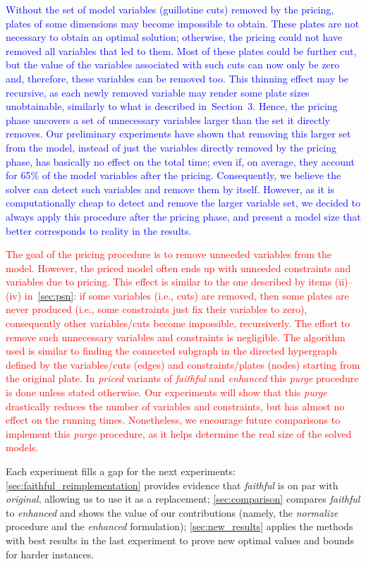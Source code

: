 \documentclass[smallextended]{svjour3}       %
\newif\iffinalversion
\newcommand{\newtext}[1]{\iffinalversion%
#1%
\else%
\textcolor{blue}{#1}%
\fi%
}
\newcommand{\oldtext}[1]{\iffinalversion%
\else%
\textcolor{red}{#1}%
\fi%
}
\begin{document}
\newtext{Without the set of model variables (guillotine cuts) removed by the pricing, plates of some dimensions may become impossible to obtain. These plates are not necessary to obtain an optimal solution; otherwise, the pricing could not have removed all variables that led to them. Most of these plates could be further cut, but the value of the variables associated with such cuts can now only be zero and, therefore, these variables can be removed too. This thinning effect may be recursive, as each newly removed variable may render some plate sizes unobtainable, similarly to what is described in~Section~3. Hence, the pricing phase uncovers a set of unnecessary variables larger than the set it directly removes. Our preliminary experiments have shown that removing this larger set from the model, instead of just the variables directly removed by the pricing phase, has basically no effect on the total time; even if, on average, they account for 65\% of the model variables after the pricing. Consequently, we believe the solver can detect such variables and remove them by itself. However, as it is computationally cheap to detect and remove the larger variable set, we decided to always apply this procedure after the pricing phase, and present a model size that better corresponds to reality in the results.}
\oldtext{The goal of the pricing procedure is to remove unneeded variables from the model. However, the priced model often ends up with unneeded constraints and variables due to pricing. This effect is similar to the one described by items (ii)--(iv) in~\autoref{sec:psn}: if some variables (i.e., cuts) are removed, then some plates are never produced (i.e., some constraints just fix their variables to zero), consequently other variables/cuts become impossible, recursiverly. The effort to remove such unnecessary variables and constraints is negligible. The algorithm used is similar to finding the connected subgraph in the directed hypergraph defined by the variables/cuts (edges) and constraints/plates (nodes) starting from the original plate. In \emph{priced} variants of \emph{faithful} and \emph{enhanced} this \emph{purge} procedure is done unless stated otherwise. Our experiments will show that this \emph{purge} drastically reduces the number of variables and constraints, but has almost no effect on the running times. Nonetheless, we encourage future comparisons to implement this \emph{purge} procedure, as it helps determine the real size of the solved models.}

Each experiment fills a gap for the next experiments:%
\autoref{sec:faithful_reimplementation} provides evidence that \emph{faithful} is on par with \emph{original}, allowing us to use it as a replacement;
\autoref{sec:comparison} compares \emph{faithful} to \emph{enhanced} and shows the value of our contributions (namely, the \emph{normalize} procedure and the \emph{enhanced} formulation);
\autoref{sec:new_results} applies the methods with best results in the last experiment to prove new optimal values and bounds for harder instances.
\end{document}
